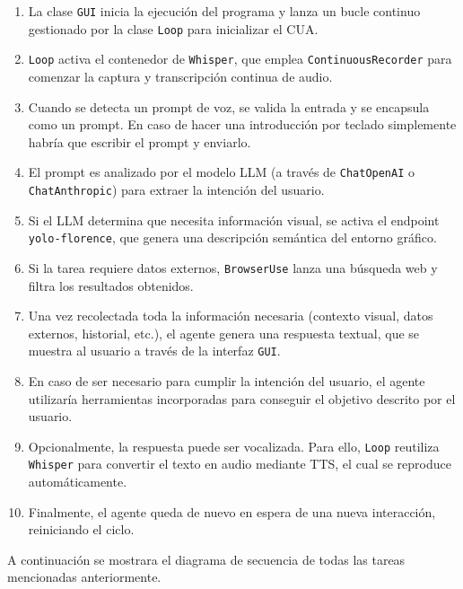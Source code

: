 \begin{enumerate}
\item La clase \texttt{GUI} inicia la ejecución del programa y lanza un bucle continuo gestionado por la clase \texttt{Loop} para inicializar el CUA.

\item \texttt{Loop} activa el contenedor de \texttt{Whisper}, que emplea \texttt{ContinuousRecorder} para comenzar la captura y transcripción continua de audio.

\item Cuando se detecta un prompt de voz, se valida la entrada y se encapsula como un prompt. En caso de hacer una introducción por teclado simplemente habría que escribir el prompt y enviarlo.

\item El prompt es analizado por el modelo LLM (a través de \texttt{ChatOpenAI} o \texttt{ChatAnthropic}) para extraer la intención del usuario.

\item Si el LLM determina que necesita información visual, se activa el endpoint \texttt{yolo-florence}, que genera una descripción semántica del entorno gráfico.

\item Si la tarea requiere datos externos, \texttt{BrowserUse} lanza una búsqueda web y filtra los resultados obtenidos.

\item Una vez recolectada toda la información necesaria (contexto visual, datos externos, historial, etc.), el agente genera una respuesta textual, que se muestra al usuario a través de la interfaz \texttt{GUI}.

\item En caso de ser necesario para cumplir la intención del usuario, el agente utilizaría herramientas incorporadas para conseguir el objetivo descrito por el usuario.

\item Opcionalmente, la respuesta puede ser vocalizada. Para ello, \texttt{Loop} reutiliza \texttt{Whisper} para convertir el texto en audio mediante TTS, el cual se reproduce automáticamente.

\item Finalmente, el agente queda de nuevo en espera de una nueva interacción, reiniciando el ciclo.
\end{enumerate}

A continuación se mostrara el diagrama de secuencia de todas las tareas mencionadas anteriormente.


